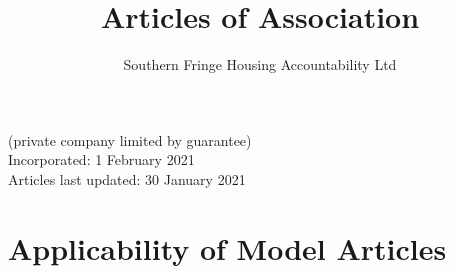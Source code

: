\documentclass[12pt]{article}
\newcommand{\TBD}[0]{\textit{To be determined}}
\newcommand{\Name}[0]{Southern Fringe
  Housing Accountability Ltd}
\begin{document}
\title{
Articles of Association\\
}
\author{\Name{}\\
}
\date{}

\maketitle

\begin{center}
(private company limited by guarantee)\\
\medskip
Incorporated: 1 February 2021 \\
\medskip
Articles last updated: 30 January 2021
\end{center}


\section{Applicability of Model Articles}
\end{document}
